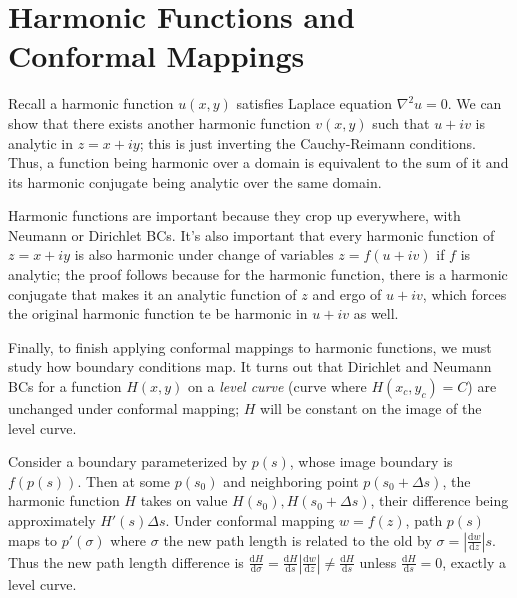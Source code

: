 \documentclass[12pt]{report}
\newcommand{\rd}[2]{\frac{\mathrm{d}#1}{\mathrm{d}#2}}
\newcommand{\abs}[1]{\left|#1\right|}
\begin{document}
\section{Harmonic Functions and Conformal Mappings}

Recall a harmonic function $u(x, y)$ satisfies Laplace equation $\nabla^2 u =
0$. We can show that there exists another harmonic function $v(x, y)$ such that
$u + iv$ is analytic in $z = x + iy$; this is just inverting the Cauchy-Reimann
conditions. Thus, a function being harmonic over a domain is equivalent to the
sum of it and its harmonic conjugate being analytic over the same domain.

Harmonic functions are important because they crop up everywhere, with Neumann
or Dirichlet BCs. It's also important that every harmonic function of $z = x +
iy$ is also harmonic under change of variables $z = f(u + iv)$ if $f$ is
analytic; the proof follows because for the harmonic function, there is a
harmonic conjugate that makes it an analytic function of $z$ and ergo of $u +
iv$, which forces the original harmonic function te be harmonic in $u + iv$ as
well.

Finally, to finish applying conformal mappings to harmonic functions, we must
study how boundary conditions map. It turns out that Dirichlet and Neumann BCs
for a function $H(x, y)$ on a \emph{level curve} (curve where $H(x_c, y_c) = C$)
are unchanged under conformal mapping; $H$ will be constant on the image of the
level curve.

Consider a boundary parameterized by $p(s)$, whose image boundary is $f(p(s))$.
Then at some $p(s_0)$ and neighboring point $p(s_0 + \Delta s)$, the harmonic
function $H$ takes on value $H(s_0), H(s_0 + \Delta s)$, their difference
being approximately $H'(s) \Delta s$. Under conformal mapping $w = f(z)$,
path $p(s)$ maps to $p'(\sigma)$ where $\sigma$ the new path length is related
to the old by $\sigma = \abs{\rd{w}{z}}s$. Thus the new path length difference
is $\rd{H}{\sigma} = \rd{H}{s}\abs{\rd{w}{z}} \neq \rd{H}{s}$ unless $\rd{H}{s}
= 0$, exactly a level curve.
\end{document}
